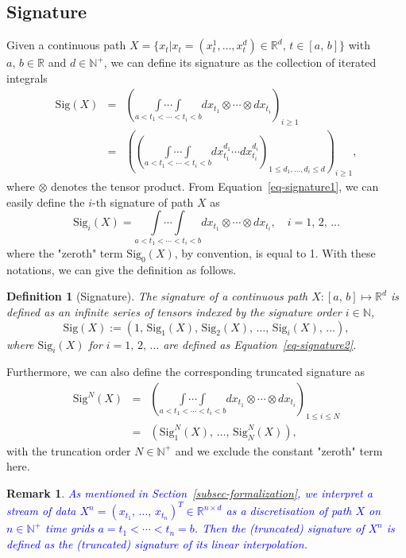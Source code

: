 \documentclass[]{article}
\newtheorem{definition}{\hspace{6mm}Definition}[section]
\newtheorem{remark}{\hspace{6mm}Remark}[section]
\renewcommand{\(}{\left(}
\renewcommand{\)}{\right)}
\begin{document}
	\subsection{Signature}\label{subsec-signature}
	Given a continuous path $X=\{x_t | x_t=(x_t^1,\ldots,x_t^d)\in\mathbb{R}^d,\,t\in[a,\,b]\}$ with $a,\,b\in\mathbb{R}$ and $d\in\mathbb{N}^+$, we can define its signature as the collection of iterated integrals
	\begin{eqnarray}
		\label{eq-signature1}
		\text{Sig}(X)
		&=&\left(\underset{a<t_1<\cdots<t_i<b}{\int\cdots\int}dx_{t_1}\otimes\cdots\otimes dx_{t_i}\right)_{i\geq1} \nonumber\\
		&=&\left(\left(\underset{a<t_1<\cdots<t_i<b}{\int\cdots\int}dx_{t_1}^{d_1}\cdots dx_{t_i}^{d_i}\right)_{1\leq d_1,\ldots, d_i\leq d}\right)_{i\geq1},
	\end{eqnarray}
	where $\otimes$ denotes the tensor product. From Equation~\eqref{eq-signature1}, we can easily define the $i\text{-th}$ signature of path $X$ as
	\begin{equation}
		\label{eq-signature2}
		\text{Sig}_i(X) = \underset{a<t_1<\cdots<t_i<b}{\int\cdots\int}dx_{t_1}\otimes\cdots\otimes dx_{t_i},\quad i=1,\,2,\,\ldots
	\end{equation}
	where the "zeroth" term $\text{Sig}_0(X)$, by convention, is equal to 1. With these notations, we can give the definition as follows.
	\begin{definition}[Signature]
		\label{def-signature}
		The signature of a continuous path $X:[a,\,b]\mapsto\mathbb{R}^d$ is defined as an infinite series of tensors indexed by the signature order $i\in\mathbb{N}$,
		$$\text{Sig}(X):=\left(1,\,\text{Sig}_1(X),\,\text{Sig}_2(X),\,\ldots,\,\text{Sig}_i(X),\,\ldots\right),$$
		where $\text{Sig}_i(X)$ for $i=1,\,2,\,\ldots$ are defined as Equation~\eqref{eq-signature2}.
	\end{definition}
	Furthermore, we can also define the corresponding truncated signature as 
	\begin{eqnarray}
		\label{eq-signature3}
		\text{Sig}^N(X)
		&=&\left(\underset{a<t_1<\cdots<t_i<b}{\int\cdots\int}dx_{t_1}\otimes\cdots\otimes dx_{t_i}\right)_{1\leq i\leq N} \nonumber\\
		&=&\left(\text{Sig}^N_1(X),\,\ldots,\,\text{Sig}^N_N(X)\right),
	\end{eqnarray}
	with the truncation order $N\in\mathbb{N}^+$ and we exclude the constant "zeroth" term here. 
	\begin{remark}
		\label{rmk-stream-signature}
		\textcolor{blue}{As mentioned in Section~\ref{subsec-formalization}, we interpret a stream of data $X^n={(x_{t_1},\,\ldots,\,x_{t_n})}^T\in\mathbb{R}^{n\times d}$ as a discretisation of path $X$ on $n\in\mathbb{N}^+$ time grids $a=t_1<\cdots<t_n=b$. Then the (truncated) signature of $X^n$ is defined as the (truncated) signature of its linear interpolation.}
	\end{remark}
\end{document}
